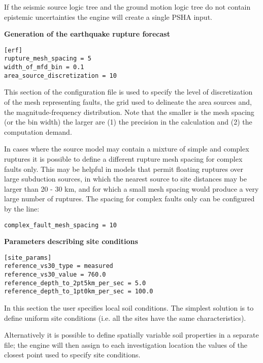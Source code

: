 If the seismic source logic tree and the ground motion logic tree do not
contain epistemic uncertainties the engine will create a single PSHA input.

\textbf{Generation of the earthquake rupture forecast}

\begin{verbatim}
[erf]
rupture_mesh_spacing = 5
width_of_mfd_bin = 0.1
area_source_discretization = 10
\end{verbatim}

This section of the configuration file is used to specify the level of
discretization of the mesh representing faults, the grid used to delineate the
area sources and, the magnitude-frequency distribution. Note that the smaller
is the mesh spacing (or the bin width) the larger are (1) the precision in the
calculation and (2) the computation demand.

In cases where the source model may contain a mixture of simple and complex
ruptures it is possible to define a different rupture mesh spacing for complex
faults only. This may be helpful in models that permit floating ruptures over
large subduction sources, in which the nearest source to site distances may be
larger than 20 - 30 km, and for which a small mesh spacing would produce a
very large number of ruptures. The spacing for complex faults only can be
configured by the line:

\begin{verbatim}
complex_fault_mesh_spacing = 10
\end{verbatim}

\textbf{Parameters describing site conditions}

\begin{verbatim}
[site_params]
reference_vs30_type = measured
reference_vs30_value = 760.0
reference_depth_to_2pt5km_per_sec = 5.0
reference_depth_to_1pt0km_per_sec = 100.0
\end{verbatim}

In this section the user specifies local soil conditions. The simplest
solution is to define uniform site conditions (i.e. all the sites have  the
same characteristics).

Alternatively it is possible to define spatially variable soil properties in
a separate file; the engine will then assign to each investigation location
the values of the closest point used to specify site conditions.

